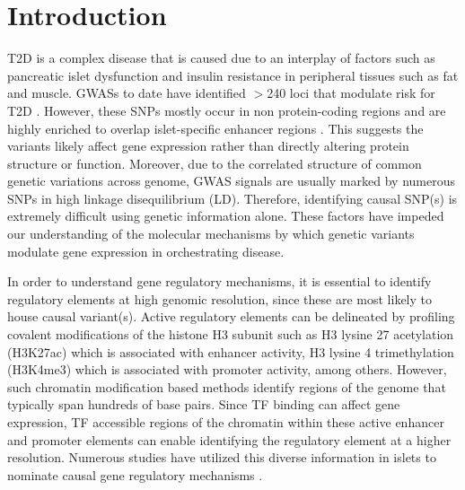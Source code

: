 \section{Introduction}
T2D is a complex disease that is caused due to an interplay of factors such as pancreatic islet dysfunction and insulin resistance in peripheral tissues such as fat and muscle. GWASs to date have identified $>$240 loci that modulate risk for T2D \cite{mahajanFinemappingTypeDiabetes2018}. However, these SNPs mostly occur in non protein-coding regions and are highly enriched to overlap islet-specific enhancer regions \cite{theencodeprojectconsortiumIntegratedEncyclopediaDNA2012, mauranoSystematicLocalizationCommon2012, trynkaChromatinMarksIdentify2013, parkerChromatinStretchEnhancer2013, pasqualiPancreaticIsletEnhancer2014, quangMotifSignaturesStretch2015}. This suggests the variants likely affect gene expression rather than directly altering protein structure or function. Moreover, due to the correlated structure of common genetic variations across genome, GWAS signals are usually marked by numerous SNPs in high linkage disequilibrium (LD). Therefore, identifying causal SNP(s) is extremely difficult using genetic information alone. These factors have impeded our understanding of the molecular mechanisms by which genetic variants modulate gene expression in orchestrating disease. 


In order to understand gene regulatory mechanisms, it is essential to identify regulatory elements at high genomic resolution, since these are most likely to house causal variant(s). Active regulatory elements can be delineated by profiling covalent modifications of the histone H3 subunit such as H3 lysine 27 acetylation (H3K27ac) which is associated with enhancer activity, H3 lysine 4 trimethylation (H3K4me3) which is associated with promoter activity, among others. However, such chromatin modification based methods identify regions of the genome that typically span hundreds of base pairs. Since TF binding can affect gene expression, TF accessible regions of the chromatin within these active enhancer and promoter elements can enable identifying the regulatory element at a higher resolution. Numerous studies have utilized this diverse information in islets to nominate causal gene regulatory mechanisms \cite{varshneyGeneticRegulatorySignatures2017,buntTranscriptExpressionData2015, fadistaGlobalGenomicTranscriptomic2014, thurnerIntegrationHumanPancreatic2018, romanTypeDiabetesAssociated2017, thurnerIntegrationHumanPancreatic2018}. 



